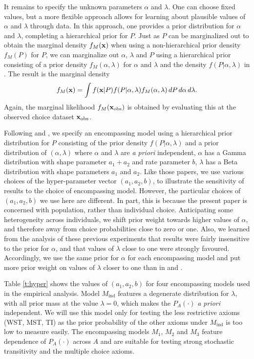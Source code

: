 \documentclass[11pt,letter]{article}
\begin{document}
It remains to specify the unknown parameters $\alpha$ and $\lambda$.
One can choose fixed values, but a more flexible approach allows for learning about plausible values of $\alpha$ and $\lambda$ through data.
In this approach, one provides a prior distribution for $\alpha$ and $\lambda$, completing a hierarchical prior for $P$.
Just as $P$ can be marginalized out to obtain the marginal density $f_M({\bf x})$ when using a non-hierarchical prior density $f_M(P)$ for $P$, we can marginalize out $\alpha$, $\lambda$ and $P$ using a hierarchical prior consisting of a prior density $f_M(\alpha,\lambda)$ for $\alpha$ and $\lambda$ and the density $f(P|\alpha,\lambda)$ in .
The result is the marginal density
\[
  f_M({\bf x}) = \int f({\bf x}|P) f(P|\alpha,\lambda) f_M(\alpha,\lambda) \, dP\, d\alpha\, d\lambda.
\]
Again, the marginal likelihood $f_M({\bf x}_{\mathrm{obs}})$ is obtained by evaluating this at the observed choice dataset ${\bf x}_{\mathrm{obs}}$.

Following  and , we specify an encompassing model using a hierarchical prior distribution for $P$ consisting of the prior density $f(P|\alpha,\lambda)$ and a prior distribution of $(\alpha,\lambda)$ where $\alpha$ and $\lambda$ are {\em a priori} independent, $\alpha$ has a Gamma distribution with shape parameter $a_1 + a_2$ and rate parameter $b$, $\lambda$ has a Beta distribution with shape parameters $a_1$ and $a_2$.
Like those papers, we use various choices of the hyper-parameter vector $(a_1,a_2,b)$, to illustrate the sensitivity of results to the choice of encompassing model.
However, the particular choices of $(a_1,a_2,b)$ we use here are different.
In part, this is because the present paper is concerned with population, rather than individual choice.
Anticipating some heterogeneity across individuals, we shift prior weight towards higher values of $\alpha$, and therefore away from choice probabilities close to zero or one.
Also, we learned from the analysis of these previous experiments that results were fairly insensitive to the prior for $\alpha$, and that values of $\lambda$ close to one were strongly favoured.
Accordingly, we use the same prior for $\alpha$ for each encompassing model and put more prior weight on values of $\lambda$ closer to one than in  and .

Table \ref{t:hyper} shows the values of $(a_1, a_2, b)$ for four encompassing models used in the empirical analysis.
Model $M_{\mathrm{ind}}$ features a degenerate distribution for $\lambda$, with all prior mass at the value $\lambda = 0$, which makes the $P_A(\cdot)$ {\em a priori} independent.
We will use this model only for testing the less restrictive axioms (WST, MST, TI) as the prior probability of the other axioms under $M_{\mathrm{ind}}$ is too low to measure easily.
The encompassing models $M_1$, $M_2$ and $M_3$ feature dependence of $P_A(\cdot)$ across $A$ and are suitable for testing strong stochastic transitivity and the multiple choice axioms.
\end{document}
